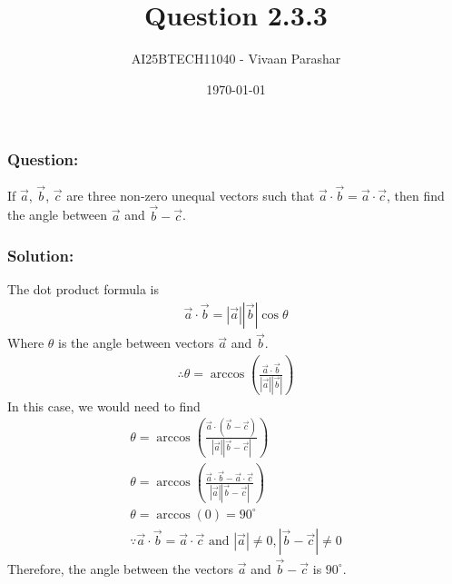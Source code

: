 \documentclass{beamer}
\title{Question 2.3.3}
\author{AI25BTECH11040 - Vivaan Parashar}
\date{\today}
\begin{document}
\frame{\titlepage}

\begin{frame}
    \frametitle{Question: }
    If $\vec{a}$, $\vec{b}$, $\vec{c}$ are three non-zero unequal vectors such that $\vec{a}\cdot\vec{b} = \vec{a}\cdot\vec{c}$, then find the angle between $\vec{a}$ and $\vec{b}-\vec{c}$.
\end{frame}

\begin{frame}
    \frametitle{Solution: }
    The dot product formula is
    \begin{align}
        \vec{a}\cdot\vec{b} = |\vec{a}||\vec{b}|\cos\theta
    \end{align} Where $\theta$ is the angle between vectors $\vec{a}$ and $\vec{b}$.
    \begin{align}
        \therefore\theta = \arccos(\frac{\vec{a}\cdot\vec{b}}{|\vec{a}||\vec{b}|})
    \end{align}
    In this case, we would need to find
    \begin{align}
        \theta = \arccos(\frac{\vec{a}\cdot(\vec{b}-\vec{c})}{|\vec{a}||\vec{b}-\vec{c}|})           \\
        \theta = \arccos(\frac{\vec{a}\cdot\vec{b}-\vec{a}\cdot\vec{c}}{|\vec{a}||\vec{b}-\vec{c}|}) \\
        \theta = \arccos(0) = 90^\circ                                                               \\
        \because \vec{a}\cdot\vec{b}=\vec{a}\cdot\vec{c} \text{ and } |\vec{a}| \ne 0, |\vec{b}-\vec{c}| \ne 0
    \end{align}
    Therefore, the angle between the vectors $\vec{a}$ and $\vec{b}-\vec{c}$ is $90^\circ$.
\end{frame}
\end{document}
